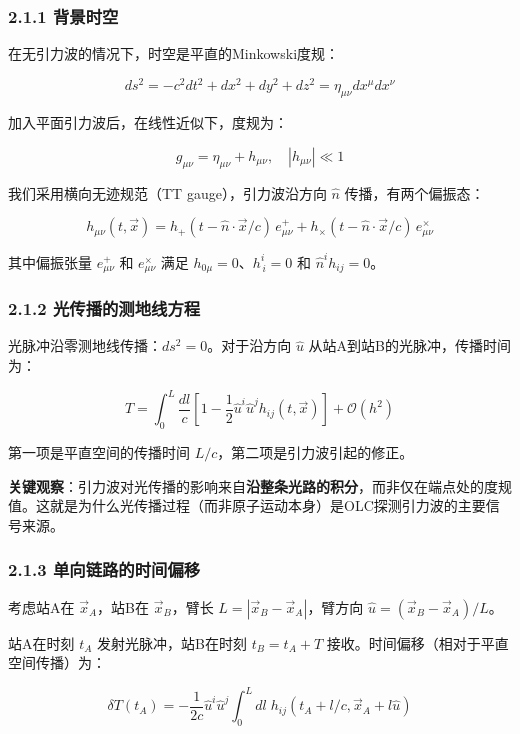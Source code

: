 \documentclass[12pt,a4paper]{article}
\begin{document}
\subsubsection{2.1.1 背景时空}


在无引力波的情况下，时空是平直的Minkowski度规：

$$ds^2 = -c^2 dt^2 + dx^2 + dy^2 + dz^2 = \eta_{\mu\nu} dx^\mu dx^\nu$$

加入平面引力波后，在线性近似下，度规为：

$$g_{\mu\nu} = \eta_{\mu\nu} + h_{\mu\nu}, \quad |h_{\mu\nu}| \ll 1$$

我们采用横向无迹规范（TT gauge），引力波沿方向 $\hat{n}$ 传播，有两个偏振态：

$$h_{\mu\nu}(t, \vec{x}) = h_+(t - \hat{n}\cdot\vec{x}/c)\, e_{\mu\nu}^+ + h_\times(t - \hat{n}\cdot\vec{x}/c)\, e_{\mu\nu}^\times$$

其中偏振张量 $e_{\mu\nu}^+$ 和 $e_{\mu\nu}^\times$ 满足 $h_{0\mu}=0$、$h^i_{\,i}=0$ 和 $\hat{n}^i h_{ij}=0$。

\subsubsection{2.1.2 光传播的测地线方程}


光脉冲沿零测地线传播：$ds^2 = 0$。对于沿方向 $\hat{u}$ 从站A到站B的光脉冲，传播时间为：

$$T = \int_0^L \frac{dl}{c} \left[1 - \frac{1}{2}\hat{u}^i \hat{u}^j h_{ij}(t, \vec{x})\right] + \mathcal{O}(h^2)$$

第一项是平直空间的传播时间 $L/c$，第二项是引力波引起的修正。

\textbf{关键观察}：引力波对光传播的影响来自\textbf{沿整条光路的积分}，而非仅在端点处的度规值。这就是为什么光传播过程（而非原子运动本身）是OLC探测引力波的主要信号来源。

\subsubsection{2.1.3 单向链路的时间偏移}


考虑站A在 $\vec{x}_A$，站B在 $\vec{x}_B$，臂长 $L = |\vec{x}_B - \vec{x}_A|$，臂方向 $\hat{u} = (\vec{x}_B - \vec{x}_A)/L$。

站A在时刻 $t_A$ 发射光脉冲，站B在时刻 $t_B = t_A + T$ 接收。时间偏移（相对于平直空间传播）为：

$$\delta T(t_A) = -\frac{1}{2c} \hat{u}^i \hat{u}^j \int_0^L dl\; h_{ij}(t_A + l/c, \vec{x}_A + l\hat{u})$$
\end{document}
